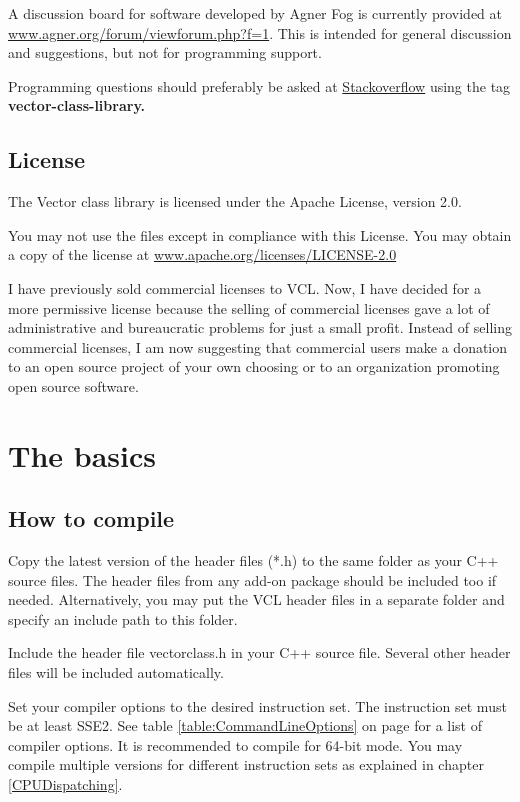 \documentclass[vcl_manual.tex]{subfiles}
\begin{document}
A discussion board for software developed by Agner Fog is currently provided at
\href{https://www.agner.org/forum/viewforum.php?f=1}{www.agner.org/forum/viewforum.php?f=1}. This is intended for general discussion and suggestions, but not for programming support. 

Programming questions should preferably be asked at 
\href{https://stackoverflow.com}{Stackoverflow} using the tag \bf{vector-class-library}.


\section{License} \label{License}
The Vector class library is licensed under the Apache License, version 2.0.

You may not use the files except in compliance with this License.
You may obtain a copy of the license at
\href{https://www.apache.org/licenses/LICENSE-2.0}{www.apache.org/licenses/LICENSE-2.0}

I have previously sold commercial licenses to VCL. Now, I have decided for a more permissive license because the selling of commercial licenses gave a lot of administrative and bureaucratic problems for just a small profit. Instead of selling commercial licenses, I am now suggesting that commercial users make a donation to an open source project of your own choosing or to an organization promoting open source software.


\chapter{The basics}\label{chap:TheBasics}
\section{How to compile} \label{HowToCompile}

Copy the latest version of the header files (*.h) to the same folder as your C++ source files. The header files from any add-on package should be included too if needed. Alternatively, you may put the VCL header files in a separate folder and specify an include path to this folder.

Include the header file vectorclass.h in your C++ source file.
Several other header files will be included automatically.

Set your compiler options to the desired instruction set. The instruction set must be at least SSE2. See table \ref{table:CommandLineOptions} on page \pageref{table:CommandLineOptions} for a list of compiler options. It is recommended to compile for 64-bit mode.
You may compile multiple versions for different instruction sets as explained in chapter \ref{CPUDispatching}.
\end{document}
